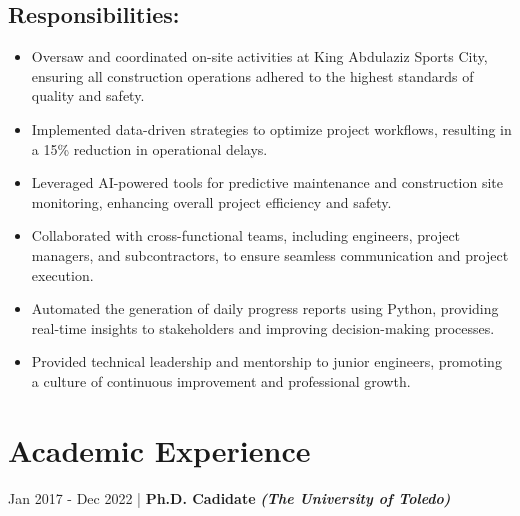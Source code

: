 \documentclass[letterpaper,
		10pt]{article}
\begin{document}
\subsection{Responsibilities:}
\begin{itemize}
\item Oversaw and coordinated on-site activities at King Abdulaziz Sports City, ensuring all construction operations adhered to the highest standards of quality and safety.
\item Implemented data-driven strategies to optimize project workflows, resulting in a 15\% reduction in operational delays.
\item Leveraged AI-powered tools for predictive maintenance and construction site monitoring, enhancing overall project efficiency and safety.
\item Collaborated with cross-functional teams, including engineers, project managers, and subcontractors, to ensure seamless communication and project execution.
\item Automated the generation of daily progress reports using Python, providing real-time insights to stakeholders and improving decision-making processes.
\item Provided technical leadership and mentorship to junior engineers, promoting a culture of continuous improvement and professional growth.
\end{itemize}

\section{Academic Experience}
Jan 2017 - Dec 2022 | \textbf{Ph.D. Cadidate} \textit{\textbf{ (The University of Toledo)}}
\end{document}

